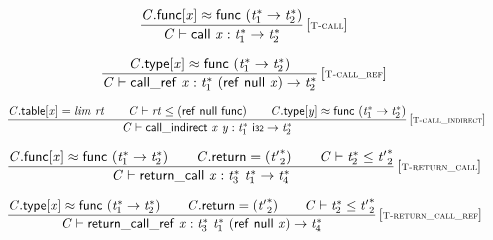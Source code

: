 $$
\begin{array}{@{}c@{}}\displaystyle
\frac{
{\mathit{C}}.\mathsf{func}{}[{\mathit{x}}] \approx \mathsf{func}~({{\mathit{t}}_{{1}}^\ast} \rightarrow {{\mathit{t}}_{{2}}^\ast})
}{
{\mathit{C}} \vdash \mathsf{call}~{\mathit{x}} : {{\mathit{t}}_{{1}}^\ast} \rightarrow {{\mathit{t}}_{{2}}^\ast}
} \, {[\textsc{\scriptsize T{-}call}]}
\qquad
\end{array}
$$

$$
\begin{array}{@{}c@{}}\displaystyle
\frac{
{\mathit{C}}.\mathsf{type}{}[{\mathit{x}}] \approx \mathsf{func}~({{\mathit{t}}_{{1}}^\ast} \rightarrow {{\mathit{t}}_{{2}}^\ast})
}{
{\mathit{C}} \vdash \mathsf{call\_ref}~{\mathit{x}} : {{\mathit{t}}_{{1}}^\ast}~(\mathsf{ref}~\mathsf{null}~{\mathit{x}}) \rightarrow {{\mathit{t}}_{{2}}^\ast}
} \, {[\textsc{\scriptsize T{-}call\_ref}]}
\qquad
\end{array}
$$

$$
\begin{array}{@{}c@{}}\displaystyle
\frac{
{\mathit{C}}.\mathsf{table}{}[{\mathit{x}}] = {\mathit{lim}}~{\mathit{rt}}
 \qquad
{\mathit{C}} \vdash {\mathit{rt}} \leq (\mathsf{ref}~\mathsf{null}~\mathsf{func})
 \qquad
{\mathit{C}}.\mathsf{type}{}[{\mathit{y}}] \approx \mathsf{func}~({{\mathit{t}}_{{1}}^\ast} \rightarrow {{\mathit{t}}_{{2}}^\ast})
}{
{\mathit{C}} \vdash \mathsf{call\_indirect}~{\mathit{x}}~{\mathit{y}} : {{\mathit{t}}_{{1}}^\ast}~\mathsf{i{\scriptstyle32}} \rightarrow {{\mathit{t}}_{{2}}^\ast}
} \, {[\textsc{\scriptsize T{-}call\_indirect}]}
\qquad
\end{array}
$$

$$
\begin{array}{@{}c@{}}\displaystyle
\frac{
{\mathit{C}}.\mathsf{func}{}[{\mathit{x}}] \approx \mathsf{func}~({{\mathit{t}}_{{1}}^\ast} \rightarrow {{\mathit{t}}_{{2}}^\ast})
 \qquad
{\mathit{C}}.\mathsf{return} = ({{\mathit{t}'}_{{2}}^\ast})
 \qquad
{\mathit{C}} \vdash {{\mathit{t}}_{{2}}^\ast} \leq {{\mathit{t}'}_{{2}}^\ast}
}{
{\mathit{C}} \vdash \mathsf{return\_call}~{\mathit{x}} : {{\mathit{t}}_{{3}}^\ast}~{{\mathit{t}}_{{1}}^\ast} \rightarrow {{\mathit{t}}_{{4}}^\ast}
} \, {[\textsc{\scriptsize T{-}return\_call}]}
\qquad
\end{array}
$$

$$
\begin{array}{@{}c@{}}\displaystyle
\frac{
{\mathit{C}}.\mathsf{type}{}[{\mathit{x}}] \approx \mathsf{func}~({{\mathit{t}}_{{1}}^\ast} \rightarrow {{\mathit{t}}_{{2}}^\ast})
 \qquad
{\mathit{C}}.\mathsf{return} = ({{\mathit{t}'}_{{2}}^\ast})
 \qquad
{\mathit{C}} \vdash {{\mathit{t}}_{{2}}^\ast} \leq {{\mathit{t}'}_{{2}}^\ast}
}{
{\mathit{C}} \vdash \mathsf{return\_call\_ref}~{\mathit{x}} : {{\mathit{t}}_{{3}}^\ast}~{{\mathit{t}}_{{1}}^\ast}~(\mathsf{ref}~\mathsf{null}~{\mathit{x}}) \rightarrow {{\mathit{t}}_{{4}}^\ast}
} \, {[\textsc{\scriptsize T{-}return\_call\_ref}]}
\qquad
\end{array}
$$

